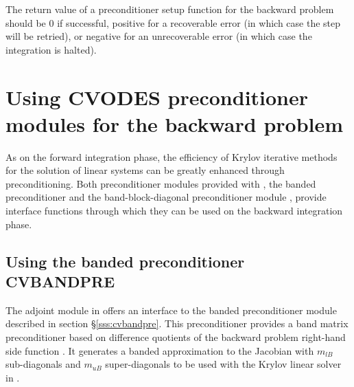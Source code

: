 {
  The return value of a preconditioner setup function for the backward
  problem should be $0$ if successful, 
  positive for a recoverable error (in which case the step will be retried),     
  or negative for an unrecoverable error (in which case the integration is halted).
}
{}

\section{Using CVODES preconditioner modules for the backward problem}

As on the forward integration phase, the efficiency of Krylov iterative methods 
for the solution of linear systems can be greatly enhanced through preconditioning.
Both preconditioner modules provided with {\sundials}, the banded
preconditioner {\cvbandpre} and the band-block-diagonal preconditioner module {\cvbbdpre},
provide interface functions through which they can be used on the backward integration phase.

\subsection{Using the banded preconditioner CVBANDPRE}

The adjoint module in {\cvodes} offers an interface to the banded 
preconditioner module {\cvbandpre} described in section \S\ref{sss:cvbandpre}.
This preconditioner provides a band matrix preconditioner based on difference
quotients of the backward problem right-hand side function . It generates
a banded approximation to the Jacobian with $m_{lB}$ sub-diagonals and $m_{uB}$
super-diagonals to be used with the Krylov linear solver in {\cvspgmr}.

